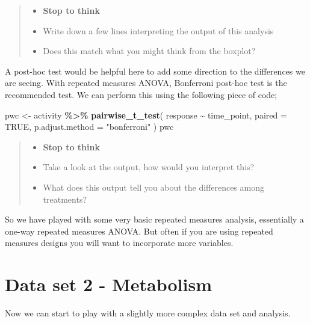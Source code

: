 \documentclass[
]{book}
\newenvironment{Shaded}{\begin{snugshade}}{\end{snugshade}}
\newcommand{\AttributeTok}[1]{\textcolor[rgb]{0.13,0.29,0.53}{#1}}
\newcommand{\ConstantTok}[1]{\textcolor[rgb]{0.56,0.35,0.01}{#1}}
\newcommand{\FunctionTok}[1]{\textcolor[rgb]{0.13,0.29,0.53}{\textbf{#1}}}
\newcommand{\NormalTok}[1]{#1}
\newcommand{\OtherTok}[1]{\textcolor[rgb]{0.56,0.35,0.01}{#1}}
\newcommand{\SpecialCharTok}[1]{\textcolor[rgb]{0.81,0.36,0.00}{\textbf{#1}}}
\newcommand{\StringTok}[1]{\textcolor[rgb]{0.31,0.60,0.02}{#1}}
\providecommand{\tightlist}{%
  \setlength{\itemsep}{0pt}\setlength{\parskip}{0pt}}
\begin{document}
\begin{quote}
\begin{itemize}
\tightlist
\item
  \textbf{Stop to think}
\item
  Write down a few lines interpreting the output of this analysis
\item
  Does this match what you might think from the boxplot?
\end{itemize}
\end{quote}

A post-hoc test would be helpful here to add some direction to the differences we are seeing. With repeated measures ANOVA, Bonferroni post-hoc test is the recommended test. We can perform this using the following piece of code;

\begin{Shaded}
\begin{Highlighting}[]
\NormalTok{pwc }\OtherTok{\textless{}{-}}\NormalTok{ activity }\SpecialCharTok{\%\textgreater{}\%}
  \FunctionTok{pairwise\_t\_test}\NormalTok{(}
\NormalTok{    response }\SpecialCharTok{\textasciitilde{}}\NormalTok{ time\_point, }\AttributeTok{paired =} \ConstantTok{TRUE}\NormalTok{,}
    \AttributeTok{p.adjust.method =} \StringTok{"bonferroni"}
\NormalTok{  )}
\NormalTok{pwc}
\end{Highlighting}
\end{Shaded}

\begin{quote}
\begin{itemize}
\tightlist
\item
  \textbf{Stop to think}
\item
  Take a look at the output, how would you interpret this?
\item
  What does this output tell you about the differences among treatments?
\end{itemize}
\end{quote}

So we have played with some very basic repeated measures analysis, essentially a one-way repeated measures ANOVA. But often if you are using repeated measures designs you will want to incorporate more variables.

\section{Data set 2 - Metabolism}\label{data-set-2---metabolism}

Now we can start to play with a slightly more complex data set and analysis.
\end{document}
